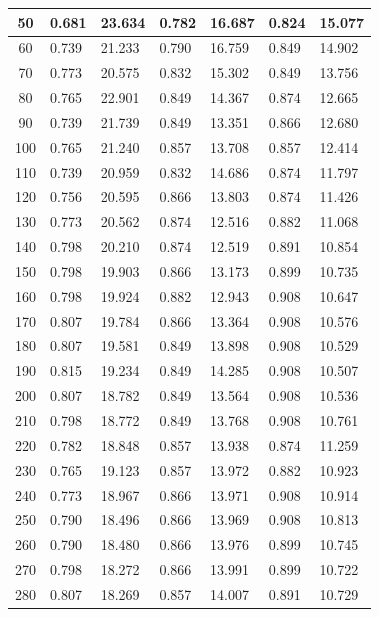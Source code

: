 \begin{longtable}{|c|l|l|l|l|l|l|}
        50 & 0.681 & 23.634 & 0.782 & 16.687 & 0.824 & 15.077 \\ \hline
        60 & 0.739 & 21.233 & 0.790 & 16.759 & 0.849 & 14.902 \\ \hline
        70 & 0.773 & 20.575 & 0.832 & 15.302 & 0.849 & 13.756 \\ \hline
        80 & 0.765 & 22.901 & 0.849 & 14.367 & 0.874 & 12.665 \\ \hline
        90 & 0.739 & 21.739 & 0.849 & 13.351 & 0.866 & 12.680 \\ \hline
        100 & 0.765 & 21.240 & 0.857 & 13.708 & 0.857 & 12.414 \\ \hline
        110 & 0.739 & 20.959 & 0.832 & 14.686 & 0.874 & 11.797 \\ \hline
        120 & 0.756 & 20.595 & 0.866 & 13.803 & 0.874 & 11.426 \\ \hline
        130 & 0.773 & 20.562 & 0.874 & 12.516 & 0.882 & 11.068 \\ \hline
        140 & 0.798 & 20.210 & 0.874 & 12.519 & 0.891 & 10.854 \\ \hline
        150 & 0.798 & 19.903 & 0.866 & 13.173 & 0.899 & 10.735 \\ \hline
        160 & 0.798 & 19.924 & 0.882 & 12.943 & 0.908 & 10.647 \\ \hline
        170 & 0.807 & 19.784 & 0.866 & 13.364 & 0.908 & 10.576 \\ \hline
        180 & 0.807 & 19.581 & 0.849 & 13.898 & 0.908 & 10.529 \\ \hline
        190 & 0.815 & 19.234 & 0.849 & 14.285 & 0.908 & 10.507 \\ \hline
        200 & 0.807 & 18.782 & 0.849 & 13.564 & 0.908 & 10.536 \\ \hline
        210 & 0.798 & 18.772 & 0.849 & 13.768 & 0.908 & 10.761 \\ \hline
        220 & 0.782 & 18.848 & 0.857 & 13.938 & 0.874 & 11.259 \\ \hline
        230 & 0.765 & 19.123 & 0.857 & 13.972 & 0.882 & 10.923 \\ \hline
        240 & 0.773 & 18.967 & 0.866 & 13.971 & 0.908 & 10.914 \\ \hline
        250 & 0.790 & 18.496 & 0.866 & 13.969 & 0.908 & 10.813 \\ \hline
        260 & 0.790 & 18.480 & 0.866 & 13.976 & 0.899 & 10.745 \\ \hline
        270 & 0.798 & 18.272 & 0.866 & 13.991 & 0.899 & 10.722 \\ \hline
        280 & 0.807 & 18.269 & 0.857 & 14.007 & 0.891 & 10.729 \\ \hline

\end{longtable}
